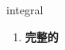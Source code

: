 
\begin{frame}
{\huge integral}
\begin{center}
\begin{enumerate}\Large
  \item \textbf{完整的}
\end{enumerate}
\end{center}
\end{frame}
